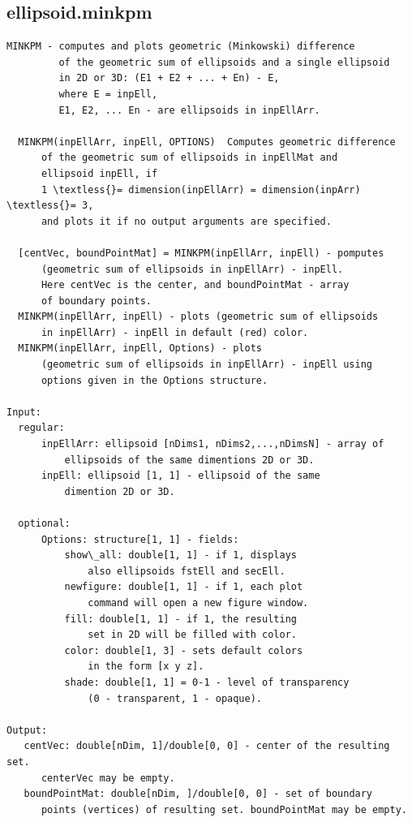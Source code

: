 \documentclass[letterpaper,10pt,english]{sphinxmanual}
\begin{document}
\subsection{ellipsoid.minkpm}
\label{chap_functions:ellipsoid-minkpm}
\begin{Verbatim}[commandchars=\\\{\}]
MINKPM - computes and plots geometric (Minkowski) difference
         of the geometric sum of ellipsoids and a single ellipsoid
         in 2D or 3D: (E1 + E2 + ... + En) - E,
         where E = inpEll,
         E1, E2, ... En - are ellipsoids in inpEllArr.

  MINKPM(inpEllArr, inpEll, OPTIONS)  Computes geometric difference
      of the geometric sum of ellipsoids in inpEllMat and
      ellipsoid inpEll, if
      1 \textless{}= dimension(inpEllArr) = dimension(inpArr) \textless{}= 3,
      and plots it if no output arguments are specified.

  [centVec, boundPointMat] = MINKPM(inpEllArr, inpEll) - pomputes
      (geometric sum of ellipsoids in inpEllArr) - inpEll.
      Here centVec is the center, and boundPointMat - array
      of boundary points.
  MINKPM(inpEllArr, inpEll) - plots (geometric sum of ellipsoids
      in inpEllArr) - inpEll in default (red) color.
  MINKPM(inpEllArr, inpEll, Options) - plots
      (geometric sum of ellipsoids in inpEllArr) - inpEll using
      options given in the Options structure.

Input:
  regular:
      inpEllArr: ellipsoid [nDims1, nDims2,...,nDimsN] - array of
          ellipsoids of the same dimentions 2D or 3D.
      inpEll: ellipsoid [1, 1] - ellipsoid of the same
          dimention 2D or 3D.

  optional:
      Options: structure[1, 1] - fields:
          show\_all: double[1, 1] - if 1, displays
              also ellipsoids fstEll and secEll.
          newfigure: double[1, 1] - if 1, each plot
              command will open a new figure window.
          fill: double[1, 1] - if 1, the resulting
              set in 2D will be filled with color.
          color: double[1, 3] - sets default colors
              in the form [x y z].
          shade: double[1, 1] = 0-1 - level of transparency
              (0 - transparent, 1 - opaque).

Output:
   centVec: double[nDim, 1]/double[0, 0] - center of the resulting set.
      centerVec may be empty.
   boundPointMat: double[nDim, ]/double[0, 0] - set of boundary
      points (vertices) of resulting set. boundPointMat may be empty.
\end{Verbatim}
\end{document}
